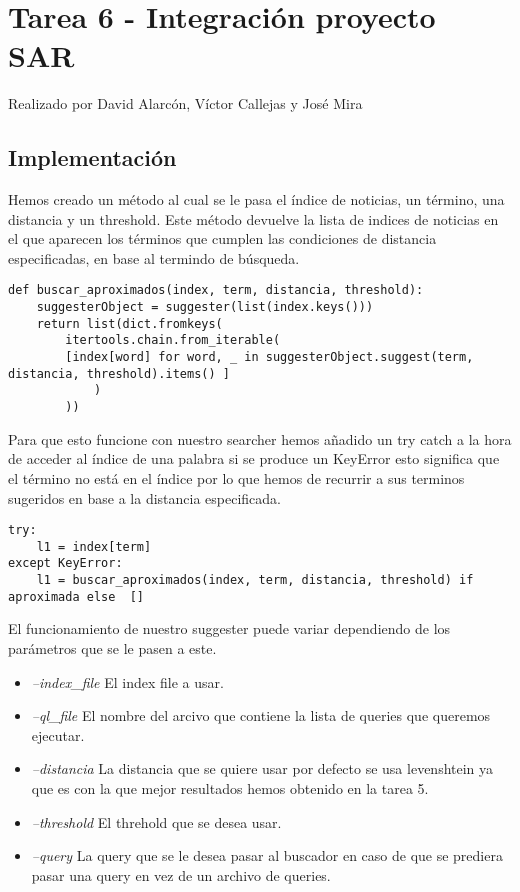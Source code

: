 \section{Tarea 6 - Integración proyecto SAR}
{\color{red}Realizado por David Alarcón, Víctor Callejas y José Mira}

\subsection{Implementación}
Hemos creado un método al cual se le pasa el índice de noticias, un término, una distancia y un threshold. Este método devuelve la lista de indices de noticias en el que aparecen los términos que cumplen las condiciones de distancia especificadas, en base al termindo de búsqueda.

\begin{lstlisting}[caption=Método buscar índices de noticias con palabras aproximadas]
def buscar_aproximados(index, term, distancia, threshold):
    suggesterObject = suggester(list(index.keys()))
    return list(dict.fromkeys(
        itertools.chain.from_iterable(
        [index[word] for word, _ in suggesterObject.suggest(term, distancia, threshold).items() ]
            )
        ))
\end{lstlisting}

Para que esto funcione con nuestro searcher hemos añadido un try catch a la hora de acceder al índice de una palabra si se produce un KeyError esto significa que el término no está en el índice por lo que hemos de recurrir a sus terminos sugeridos en base a la distancia especificada.

\begin{lstlisting}[caption=Método buscar índices de noticias con palabras aproximadas]
try:
    l1 = index[term]
except KeyError:
    l1 = buscar_aproximados(index, term, distancia, threshold) if aproximada else  []
\end{lstlisting}

El funcionamiento de nuestro suggester puede variar dependiendo de los parámetros que se le pasen a este.
\begin{itemize}
    \item \emph{--index{\_}file} El index file a usar.
    \item \emph{--ql{\_}file} El nombre del arcivo que contiene la lista de queries que queremos ejecutar.
    \item \emph{--distancia} La distancia que se quiere usar por defecto se usa levenshtein ya que es con la que mejor resultados hemos obtenido en la tarea 5.
    \item \emph{--threshold} El threhold que se desea usar.
    \item \emph{--query} La query que se le desea pasar al buscador en caso de que se prediera pasar una query en vez de un archivo de queries.
\end{itemize}

